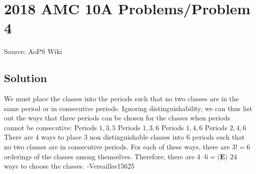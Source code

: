 \documentclass[12pt]{article}
\begin{document}
\section*{{2018 AMC 10A Problems/Problem 4}}
Source: AoPS Wiki

\subsection*{Solution}
We must place the classes into the periods such that no two classes are in the same period or in consecutive periods. Ignoring distinguishability, we can thus list out the ways that three periods can be chosen for the classes when periods cannot be consecutive: Periods $1, 3, 5$ Periods $1, 3, 6$ Periods $1, 4, 6$ Periods $2, 4, 6$ There are $4$ ways to place $3$ non distinguishable classes into $6$ periods such that no two classes are in consecutive periods. For each of these ways, there are $3! = 6$ orderings of the classes among themselves. Therefore, there are $4 \cdot 6 = \boxed{\textbf{(E) } 24}$ ways to choose the classes. -Versailles15625
\end{document}
